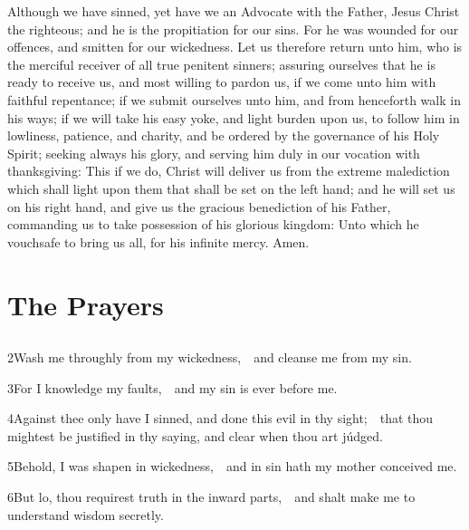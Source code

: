 {Although we have sinned, yet have we an Advocate with the Father, Jesus Christ the righteous; and he is the propitiation for our sins. For he was wounded for our offences, and smitten for our wickedness. Let us therefore return unto him, who is the merciful receiver of all true penitent sinners; assuring ourselves that he is ready to receive us, and most willing to pardon us, if we come unto him with faithful repentance; if we submit ourselves unto him, and from henceforth walk in his ways; if we will take his easy yoke, and light burden upon us, to follow him in lowliness, patience, and charity, and be ordered by the governance of his Holy Spirit; seeking always his glory, and serving him duly in our vocation with thanksgiving: This if we do, Christ will deliver us from %
the extreme malediction which shall light upon them that shall be set on the left hand; and he will set us on his right hand, and give us the gracious benediction of his Father, commanding us to take possession of his glorious kingdom: Unto which he vouchsafe to bring us all, for his infinite mercy. Amen.}


\medskip

\section{The Prayers}

\subsection{}

2\enspace Wash me throughly from my wickedness,\ \star\ and cleanse me from my sin.

3\enspace For I knowledge my faults,\ \star\ and my sin is ever before me.

4\enspace Against thee only have I sinned, and done this evil in thy sight;\ \star\ that thou mightest be justified in thy saying, and clear when thou art júdged.

5\enspace Behold, I was shapen in wickedness,\ \star\ and in sin hath my mother conceived me.

6\enspace But lo, thou requirest truth in the inward parts,\ \star\ and shalt make me to understand wisdom secretly.

